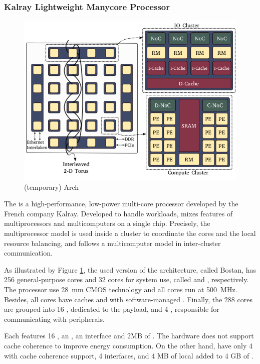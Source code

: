 		\subsubsection{Kalray \mppa Lightweight Manycore Processor}
		\label{sec::mppa}

			\begin{figure}[h]
				\centering
				\includegraphics[width=.7\textwidth]{images/arch-mppa.png}

				\caption{
					(temporary) \mppa Arch
				}\par
				\label{fig::mppa_arch}
			\end{figure}

			The \mppa is a high-performance, low-power multi-core processor
			developed by the French company Kalray.
			Developed to handle \mimd workloads, \mppa mixes features of
			multiprocessors and multicomputers on a single chip.
			Precisely, the multiprocessor model is used inside a cluster
			to coordinate the cores and the local resource balancing, and
			follows a multicomputer model in inter-cluster communication.

			As illustrated by Figure \ref{fig::mppa_arch}, the used version of
			the architecture, called Bostan, has 256 general-purpose cores and
			32 cores for system use, called \pes and \rmans, respectively.
			The processor use 28~mm CMOS technology and all cores run at 500~MHz.
			Besides, all cores have caches and \mmus with software-managed \tlbs.
			Finally, the 288 cores are grouped into 16 \cclusters, dedicated to
			the payload, and 4 \ioclusters, responsible for communicating with peripherals.

			Each \ccluster features 16 \pes, an \rman, an \noc interface and 2MB of \sram.
			The hardware does not support cache coherence to improve energy consumption.
			On the other hand, \ioclusters have only 4 \rmans with cache coherence support,
			4 \noc interfaces, and 4 MB of local \sram added to 4 GB of \dram.

